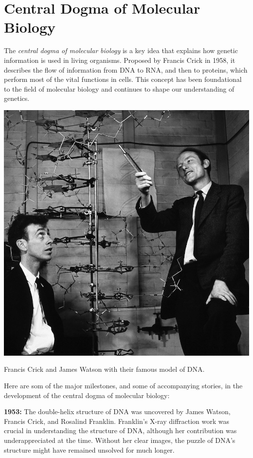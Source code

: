 \chapter{Central Dogma of Molecular Biology}

The {\em central dogma of molecular biology} is a key idea that explains how genetic information is used in living organisms. Proposed by Francis Crick in 1958, it describes the flow of information from DNA to RNA, and then to proteins, which perform most of the vital functions in cells. This concept has been foundational to the field of molecular biology and continues to shape our understanding of genetics.

\begin{marginfigure}
    \includegraphics{figs/history/watson-crick-dna.jpeg}
    \caption[6pt]{Francis Crick and James Watson with their famous model of DNA.}
    \label{fig:watson-crick-dna}
\end{marginfigure}

Here are som of the major milestones, and some of accompanying stories, in the development of the central dogma of molecular biology:

\medskip\noindent\textbf{1953:} The double-helix structure of DNA was uncovered by James Watson, Francis Crick, and Rosalind Franklin. Franklin’s X-ray diffraction work was crucial in understanding the structure of DNA, although her contribution was underappreciated at the time. Without her clear images, the puzzle of DNA’s structure might have remained unsolved for much longer.

